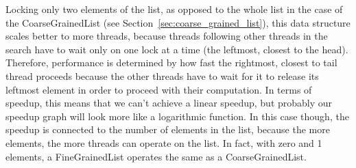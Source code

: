 \documentclass[12pt, oneside]{article}   	%
\begin{document}
Locking only two elements of the list, as opposed to the whole list in the case of the CoarseGrainedList (see Section~\ref{sec:coarse_grained_list}), this data structure scales better to more threads, because threads following other threads in the search have to wait only on one lock at a time (the leftmost, closest to the head). Therefore, performance is determined by how fast the rightmost, closest to tail thread proceeds because the other threads have to wait for it to release its leftmost element in order to proceed with their computation. In terms of speedup, this means that we can't achieve a linear speedup, but probably our speedup graph will look more like a logarithmic function. In this case though, the speedup is connected to the number of elements in the list, because the more elements, the more threads can operate on the list. In fact, with zero and 1 elements, a FineGrainedList operates the same as a CoarseGrainedList.


\end{document}
